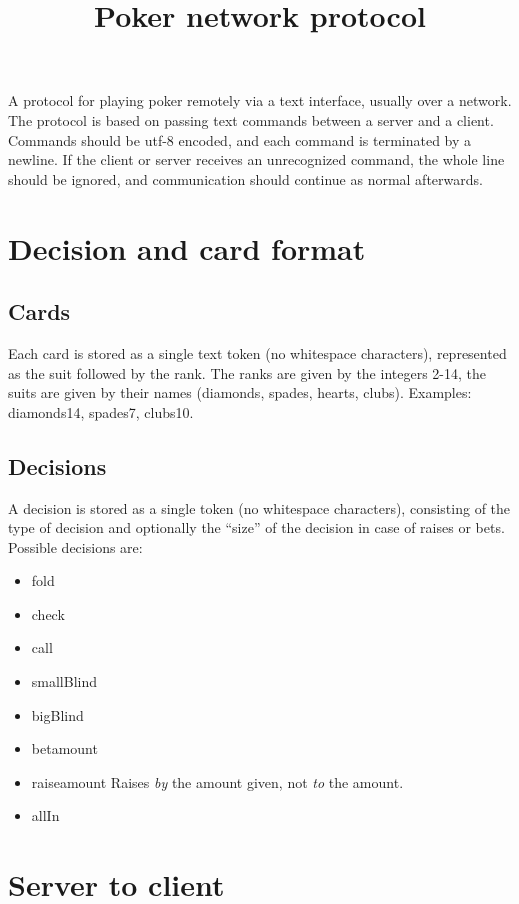 \documentclass{article}
\title{Poker network protocol}
\begin{document}
\maketitle

A protocol for playing poker remotely via a text interface, usually over a network. The protocol is based on passing text commands between a server and a client. Commands should be utf-8 encoded, and each command is terminated by a newline. If the client or server receives an unrecognized command, the whole line should be ignored, and communication should continue as normal afterwards.

\section{Decision and card format}
\subsection{Cards}
Each card is stored as a single text token (no whitespace characters), represented as the suit followed by the rank. The ranks are given by the integers 2-14, the suits are given by their names (diamonds, spades, hearts, clubs). Examples: diamonds14, spades7, clubs10.

\subsection{Decisions}
A decision is stored as a single token (no whitespace characters), consisting of the type of decision and optionally the ``size'' of the decision in case of raises or bets. Possible decisions are:

\begin{itemize}
\item fold
\item check
\item call
\item smallBlind
\item bigBlind
\item bet\textlangle{}amount\textrangle{} 
\item raise\textlangle{}amount\textrangle{} Raises \textit{by} the amount given, not \textit{to} the amount.
\item allIn
\end{itemize}

\section{Server to client}
\end{document}
